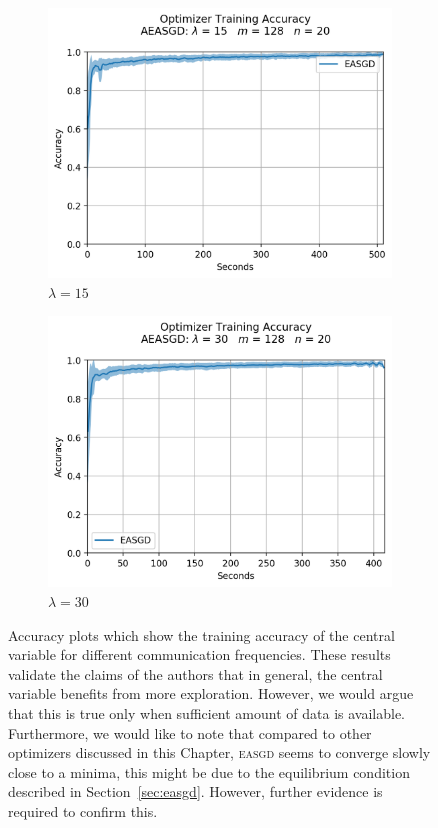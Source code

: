 \begin{figure}[H]
  \centering
  \begin{subfigure}{.49\textwidth}
    \centering
    \includegraphics[width=\textwidth]{resources/images/aeasgd_15}
    \caption{$\lambda = 15$}
  \end{subfigure}
  \begin{subfigure}{.49\textwidth}
    \centering
    \includegraphics[width=\textwidth]{resources/images/aeasgd_30}
    \caption{$\lambda = 30$}
  \end{subfigure}
  \caption{Accuracy plots which show the training accuracy of the central variable for different communication frequencies. These results validate the claims of the authors that in general, the central variable benefits from more exploration. However, we would argue that this is true only when sufficient amount of data is available. Furthermore, we would like to note that compared to other optimizers discussed in this Chapter, \textsc{easgd} seems to converge slowly close to a minima, this might be due to the equilibrium condition described in Section~\ref{sec:easgd}. However, further evidence is required to confirm this.}
  \label{fig:aeasgd_training}
\end{figure}


